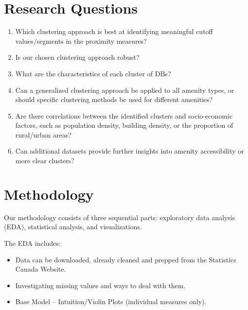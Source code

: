\documentclass[11pt, a4paper]{article}
\newcommand{\comment}[1]{}
\begin{document}
\section*{Research Questions}

\begin{enumerate}
\item Which clustering approach is best at identifying meaningful cutoff values/segments in the proximity measures? 
\item Is our chosen clustering approach robust? 
\item What are the characteristics of each cluster of DBs? 
\item Can a generalized clustering approach be applied to all amenity types, or should specific clustering methods be used for different amenities? 
\item Are there correlations between the identified clusters and socio-economic factors, such as population density, building density, or the proportion of rural/urban areas? 
\item Can additional datasets provide further insights into amenity accessibility or more clear clusters? 
\end{enumerate}






\section*{Methodology}

\comment{
\subsection*{Data Investigation}
\subsection*{Statistical Analysis}
\subsection*{Visualization}
}

Our methodology consists of three sequential parts: exploratory data analysis (EDA), statistical analysis, and visualizations.
\par
The EDA includes:
\begin{itemize}
\item Data can be downloaded, already cleaned and prepped from the Statistics Canada Website. 
\item Investigating missing values and ways to deal with them. 
\item Base Model – Intuition/Violin Plots (individual measures only).
\end{itemize}
\end{document}
